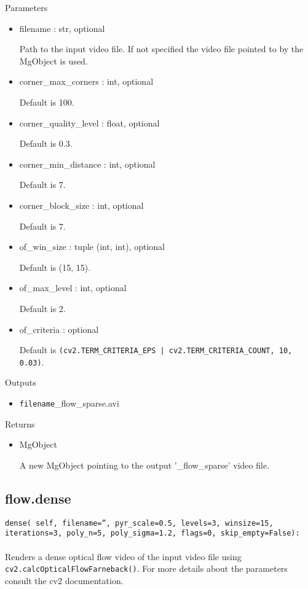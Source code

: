 \documentclass[9pt]{extarticle}
\def\code#1{\texttt{#1}}
\begin{document}
\noindent Parameters
\begin{itemize}
\item filename : str, optional

Path to the input video file. If not specified the video 
file pointed to by the MgObject is used.

\item corner\_max\_corners : int, optional

Default is 100.

\item corner\_quality\_level : float, optional

Default is 0.3.

\item corner\_min\_distance : int, optional

Default is 7.

\item corner\_block\_size : int, optional

Default is 7.

\item of\_win\_size : tuple (int, int), optional

Default is (15, 15).

\item of\_max\_level : int, optional

Default is 2.

\item of\_criteria : optional

Default is \code{(cv2.TERM\_CRITERIA\_EPS | cv2.TERM\_CRITERIA\_COUNT, 10, 0.03)}.
\end{itemize}

\noindent Outputs
\begin{itemize}
\item \code{filename}\_flow\_sparse.avi
\end{itemize}

\noindent Returns
\begin{itemize}
\item MgObject

A new MgObject pointing to the output '\_flow\_sparse' video file.
\end{itemize}


\subsection{flow.dense}

\code{dense(
    self,
    filename='',
    pyr\_scale=0.5,
    levels=3,
    winsize=15,
    iterations=3,
    poly\_n=5,
    poly\_sigma=1.2,
    flags=0,
    skip\_empty=False):}
\\\\
Renders a dense optical flow video of the input video file 
using \code{cv2.calcOpticalFlowFarneback()}.
For more details about the parameters consult the cv2 documentation.
\\\\
\end{document}
